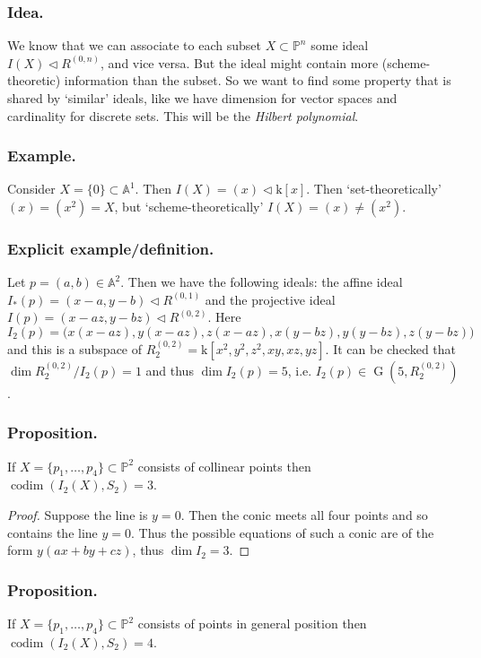 \documentclass[10pt]{article}
\numberwithin{equation}{subsubsection}
\DeclareMathOperator{\G}{G}
\DeclareMathOperator{\codim}{codim}
\renewcommand{\P}{\mathbb{P}}
\newcommand{\A}{\mathbb{A}}
\renewcommand{\k}{\mathrm{k}}
\begin{document}
            \subsubsection{Idea.} We know that we can associate to each subset $X\subset\P^n$ some ideal $I(X)\triangleleft R^{(0,n)}$, and vice versa. But the ideal might contain more (scheme-theoretic) information than the subset. So we want to find some property that is shared by `similar' ideals, like we have dimension for vector spaces and cardinality for discrete sets. This will be the \textit{Hilbert polynomial}.
            
            \subsubsection{Example.} Consider $X=\{0\}\subset\A^1$. Then $I(X)=(x)\triangleleft\k[x]$. Then `set-theoretically' $(x)=(x^2)=X$, but `scheme-theoretically' $I(X)=(x)\neq(x^2)$.
            
            \subsubsection{Explicit example/definition.} Let $p=(a,b)\in\A^2$. Then we have the following ideals: the affine ideal $I_*(p)=(x-a,y-b)\triangleleft R^{(0,1)}$ and the projective ideal $I(p)=(x-az,y-bz)\triangleleft R^{(0,2)}$. Here \[I_2(p)=\big(x(x-az),y(x-az),z(x-az),x(y-bz),y(y-bz),z(y-bz)\big)\] and this is a subspace of $R^{(0,2)}_2=\k[x^2,y^2,z^2,xy,xz,yz]$. It can be checked that $\dim R^{(0,2)}_2/I_2(p)=1$ and thus $\dim I_2(p)=5$, i.e. $I_2(p)\in\G(5,R^{(0,2)}_2)$.
            
            \subsubsection{Proposition.} If $X=\{p_1,\ldots,p_4\}\subset\P^2$ consists of collinear points then \mbox{$\codim(I_2(X),S_2)=3$.}
            
            \begin{proof}
                Suppose the line is $y=0$. Then the conic meets all four points and so contains the line $y=0$. Thus the possible equations of such a conic are of the form $y(ax+by+cz)$, thus $\dim I_2=3$.
            \end{proof}
            
            \subsubsection{Proposition.} If $X=\{p_1,\ldots,p_4\}\subset\P^2$ consists of points in general position then \mbox{$\codim(I_2(X),S_2)=4$.}
            
\end{document}
